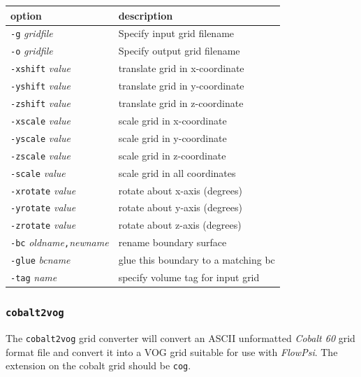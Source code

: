 \documentclass{article}
\begin{document}
\begin{table}[htbp]
\begin{center}
\begin{tabular} {|l|l|}
\hline
option & description\\
\hline\hline
  {\tt -g} {\it gridfile}           & Specify input grid filename \\
  {\tt -o} {\it gridfile}           & Specify output grid filename \\
  {\tt -xshift} {\it value}         & translate grid in x-coordinate\\
  {\tt -yshift} {\it value}         & translate grid in y-coordinate\\
  {\tt -zshift} {\it value}         & translate grid in z-coordinate\\
  {\tt -xscale} {\it value}         & scale grid in x-coordinate\\
  {\tt -yscale} {\it value}         & scale grid in y-coordinate\\
  {\tt -zscale} {\it value}         & scale grid in z-coordinate\\
  {\tt -scale}  {\it value}         & scale grid in all coordinates\\
  {\tt -xrotate} {\it value}        & rotate about x-axis (degrees)\\
  {\tt -yrotate} {\it value}        & rotate about y-axis (degrees)\\
  {\tt -zrotate} {\it value}        & rotate about z-axis (degrees)\\
  {\tt -bc} {\it oldname}{\tt ,}{\it newname} & rename boundary surface\\
  {\tt -glue} {\it bcname}          & glue this boundary to a matching bc\\
  {\tt -tag} {\it name}             & specify volume tag for input grid\\
\hline
\end{tabular}
\end{center}
\end{table}

\subsubsection{\tt cobalt2vog}

The {\tt cobalt2vog} grid converter will convert an ASCII unformatted {\it Cobalt 60} grid format file and convert it into a VOG grid suitable for use with {\em FlowPsi}.  The extension on the cobalt grid should be {\tt cog}.
\end{document}
